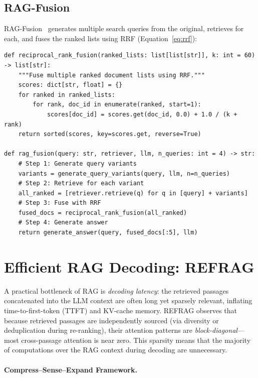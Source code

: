 \subsection{RAG-Fusion}
\label{rag-fusion}

RAG-Fusion~\cite{rackauckas2023ragfusion} generates multiple search queries from the original, retrieves for each, and fuses the ranked lists using RRF (Equation~\ref{eq:rrf}):

\begin{lstlisting}[style=pythonstyle, caption={RAG-Fusion with RRF}]
def reciprocal_rank_fusion(ranked_lists: list[list[str]], k: int = 60) -> list[str]:
    """Fuse multiple ranked document lists using RRF."""
    scores: dict[str, float] = {}
    for ranked in ranked_lists:
        for rank, doc_id in enumerate(ranked, start=1):
            scores[doc_id] = scores.get(doc_id, 0.0) + 1.0 / (k + rank)
    return sorted(scores, key=scores.get, reverse=True)

def rag_fusion(query: str, retriever, llm, n_queries: int = 4) -> str:
    # Step 1: Generate query variants
    variants = generate_query_variants(query, llm, n=n_queries)
    # Step 2: Retrieve for each variant
    all_ranked = [retriever.retrieve(q) for q in [query] + variants]
    # Step 3: Fuse with RRF
    fused_docs = reciprocal_rank_fusion(all_ranked)
    # Step 4: Generate answer
    return generate_answer(query, fused_docs[:5], llm)
\end{lstlisting}

\section{Efficient RAG Decoding: REFRAG}
\label{efficient-rag-decoding-refrag}

A practical bottleneck of RAG is \emph{decoding latency}: the retrieved passages concatenated into the LLM context are often long yet sparsely relevant, inflating time-to-first-token (TTFT) and KV-cache memory. REFRAG \cite{lin2025refrag} observes that because retrieved passages are independently sourced (via diversity or deduplication during re-ranking), their attention patterns are \emph{block-diagonal}---most cross-passage attention is near zero. This sparsity means that the majority of computations over the RAG context during decoding are unnecessary.

\paragraph{Compress--Sense--Expand Framework.}
\label{compresssenseexpand-framework.}

